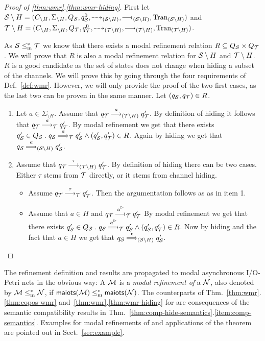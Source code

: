     \begin{proof}[Proof of \ref{thm:wmr}.\ref{thm:wmr-hiding}]
    First let $\S \setminus H = (\chan_{\setminus H},\Sigma_{\setminus H},Q_\S,q^0_\S, \may{}_{(\S\setminus H)},\must{}_{(\S\setminus H)},\val_{(\S\setminus H)})$ and $\T \setminus H = (\chan_{\setminus H},\Sigma_{\setminus H},Q_\T,q^0_\T, \may{}_{(\T\setminus H)},\must{}_{(\T\setminus H)},\val_{(\T\setminus H)})$.
    
    As $\S \mrw \T$ we know that there exists a modal refinement relation $R \subseteq Q_\S \times Q_\T$. We will prove that $R$ is also a modal refinement relation for $\S \setminus H$ and $\T \setminus H$. $R$ is a good candidate as the set of states does not change when hiding a subset of the channels. We will prove this by going through the four requirements of Def.~\ref{def:wmr}. However, we will only provide the proof of the two first cases, as the last two can be proven in the same manner.
	Let $(q_\S,q_\T) \in R$.
    \begin{enumerate}
        \item Let $a \in \Sigma_{\setminus H}$. Assume that $q_\T \must{a}_{(\T\setminus H)} q_\T'$. By definition of hiding it follows that $q_\T \must{a}_{\T} q_\T'$. By modal refinement we get that there exists $ q_\S' \in Q_\S \;.\; q_\S \mustw{a}_{\T} q_\S' \wedge (q_\S',q_\T') \in R$. Again by hiding we get that $q_\S \mustw{a}_{(\S \setminus H)} q_\S'$.
         \item Assume that $q_\T \must{\tau}_{(\T\setminus H)} q_\T'$. By definition of hiding there can be two cases. Either $\tau$ stems from $\T$ directly, or it stems from channel hiding.
         \begin{itemize}
             \item Assume $q_\T \must{\tau}_{\T} q_\T'$. Then the argumentation follows as as in item 1.
             \item Assume that $a \in H$ and $q_\T \must{\outact{a}}_{\T} q_\T'$ By modal refinement we get that there exists $ q_\S' \in Q_\S \;.\; q_\S \mustw{\outact{a}}_\T q_\S' \wedge (q_\S',q_\T') \in R$. Now by hiding and the fact that $a \in H$ we get that $q_\S \mustw{\epsilon}_{(\S \setminus H)}q_\S'$. 
         \end{itemize}
    \end{enumerate}

\end{proof}



The refinement definition and results are propagated to modal asynchronous I/O-Petri nets in the obvious way:
A \MAIOPN $\M$ is a \emph{modal refinement of} a  \MAIOPN $\pnN$, also denoted by $\M \mrw \pnN$, if
$\maiots(\M) \mrw \maiots(\pnN)$. The counterparts of Thm.~\ref{thm:wmr}.\ref{thm:copos-wmr} and~\ref{thm:wmr}.\ref{thm:wmr-hiding} for \MAIOPNs
are consequences of the semantic compatibility results in Thm.~\ref{thm:comp-hide-semantics}.\ref{item:comp-semantics}. 
Examples for modal refinements of \MAIOPNs and applications of the theorem are pointed out in Sect.~\ref{sec:example}.

